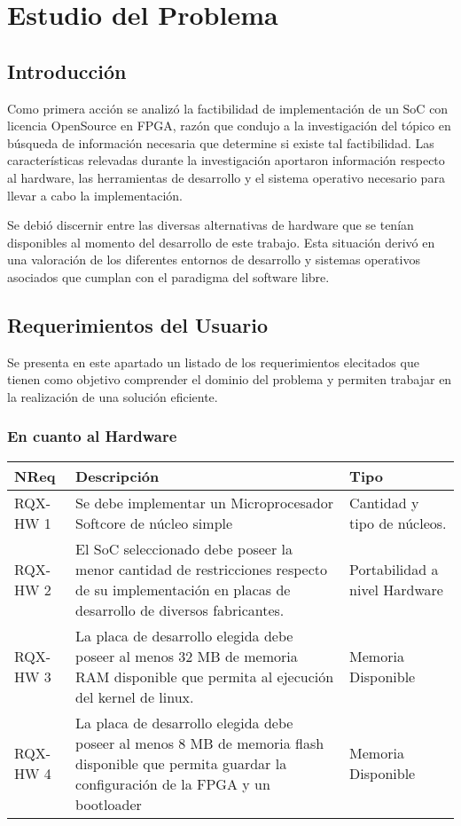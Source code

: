 \chapter{Estudio del Problema}
	\section{Introducción}
	Como primera acción se analizó la factibilidad de implementación de un
	SoC con licencia OpenSource en FPGA, razón que condujo a la investigación del
	tópico en búsqueda de información necesaria que determine si existe
	tal factibilidad. Las características relevadas durante la investigación
	aportaron información respecto al hardware, las herramientas de desarrollo y
	el sistema operativo necesario para llevar a cabo la implementación. 
	
	Se debió discernir entre las diversas alternativas de hardware que se tenían
	disponibles al momento del desarrollo de este trabajo. Esta situación derivó en
	una valoración de los diferentes entornos de desarrollo y sistemas operativos 
	asociados que cumplan con el paradigma del software libre. 
	
	\section{Requerimientos del Usuario}
	Se presenta en este apartado un listado de los requerimientos elecitados que
	tienen como objetivo comprender el dominio del problema y permiten trabajar en
	la realización de una solución eficiente.
	
		\subsection{En cuanto al Hardware}
		\begin{tabular}{ p{2.5cm} p{8cm} p{3cm} }
		\hline 
		\rowcolor[gray]{0.8} N\textordmasculine Req & Descripción & Tipo\\
		\hline
		RQX-HW 1 &  Se debe implementar un Microprocesador Softcore de núcleo simple &
		Cantidad y tipo de núcleos. \\
		\hline
		RQX-HW 2 &  El SoC seleccionado debe poseer la menor cantidad de restricciones
		respecto de su implementación en placas de desarrollo de diversos fabricantes.
		& Portabilidad a nivel Hardware\\
		\hline
		RQX-HW 3 & La placa de desarrollo elegida debe poseer al menos 32 MB de
		memoria RAM disponible que permita al ejecución del kernel de linux. & Memoria Disponible
		\\
		\hline
		RQX-HW 4 & La placa de desarrollo elegida debe poseer al menos 8 MB de
		memoria flash disponible que permita guardar la configuración de la FPGA y un
		bootloader & Memoria Disponible\\
		\hline
		\end{tabular}
					
